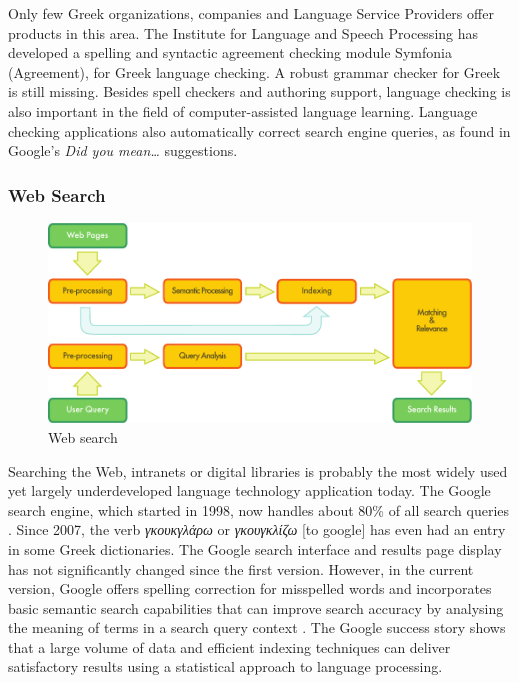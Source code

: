 \documentclass[]{../../metanetpaper}
\begin{document}
\begin{multicols}{2}
Only few Greek organizations, companies and Language Service Providers offer products in this area. The Institute for Language and Speech Processing has developed a spelling and syntactic agreement checking module Symfonia (Agreement), for Greek language checking. A robust grammar checker for Greek is still missing.
Besides spell checkers and authoring support, language checking is also important in the field of computer-assisted language learning. Language checking applications also automatically correct search engine queries, as found in Google's \textit{Did you mean…} suggestions.

\subsubsection{Web Search}

\begin{figure}[htb]
  \center
  \includegraphics[width=\textwidth]{../_media/english/web_search_architecture}
  \caption{Web search}
  \label{fig:websearcharch_en}
 \end{figure}

Searching the Web, intranets or digital libraries is probably the most widely used yet largely underdeveloped language technology application today. The Google search engine, which started in 1998, now handles about 80\% of all search queries \cite{spi1}. Since 2007, the verb \textit{γκουκγλάρω} or \textit{γκουγκλίζω} [to google] has even had an entry in some Greek dictionaries. The Google search interface and results page display has not significantly changed since the first version. However, in the current version, Google offers spelling correction for misspelled words and incorporates basic semantic search capabilities that can improve search accuracy by analysing the meaning of terms in a search query context \cite{pc1}. The Google success story shows that a large volume of data and efficient indexing techniques can deliver satisfactory results using a statistical approach to language processing. 


\end{multicols}
\end{document}
